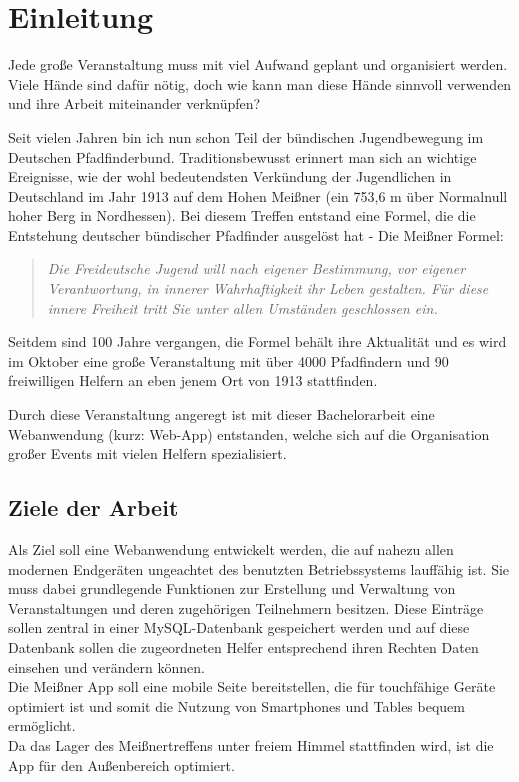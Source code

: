 \chapter{Einleitung}
Jede große Veranstaltung muss mit viel Aufwand geplant und organisiert werden. Viele Hände sind dafür nötig, doch wie kann man diese Hände sinnvoll verwenden und ihre Arbeit miteinander verknüpfen?\par

Seit vielen Jahren bin ich nun schon Teil der bündischen Jugendbewegung im Deutschen Pfadfinderbund. Traditionsbewusst erinnert man sich an wichtige Ereignisse, wie der wohl bedeutendsten Verkündung der Jugendlichen in Deutschland im Jahr 1913 auf dem Hohen Meißner (ein 753,6 m über Normalnull hoher Berg in Nordhessen). Bei diesem Treffen entstand eine Formel, die die Entstehung deutscher bündischer Pfadfinder ausgelöst hat - Die Meißner Formel:
\begin{quote}
	\textit{\glqq Die Freideutsche Jugend will nach eigener Bestimmung, vor eigener Verantwortung, in innerer Wahrhaftigkeit ihr Leben gestalten. Für diese innere Freiheit tritt Sie unter allen Umständen geschlossen ein.\grqq{}}\cite[S. 109]{meissnerformel}
\end{quote}
Seitdem sind 100 Jahre vergangen, die Formel behält ihre Aktualität und es wird im Oktober eine große Veranstaltung mit über 4000 Pfadfindern und 90 freiwilligen Helfern an eben jenem Ort von 1913 stattfinden.\par

Durch diese Veranstaltung angeregt ist mit dieser Bachelorarbeit eine Webanwendung (kurz: Web-App) entstanden, welche sich auf die Organisation großer Events mit vielen Helfern spezialisiert.

\section{Ziele der Arbeit}
Als Ziel soll eine Webanwendung entwickelt werden, die auf nahezu allen modernen Endgeräten ungeachtet des benutzten Betriebssystems lauffähig ist. Sie muss dabei grundlegende Funktionen zur Erstellung und Verwaltung von Veranstaltungen und deren zugehörigen Teilnehmern besitzen. Diese Einträge sollen zentral in einer MySQL-Datenbank gespeichert werden und auf diese Datenbank sollen die zugeordneten Helfer entsprechend ihren Rechten Daten einsehen und verändern können.\\
Die Meißner App soll eine mobile Seite bereitstellen, die für touchfähige Geräte optimiert ist und somit die Nutzung von Smartphones und Tables bequem ermöglicht.\\
Da das Lager des Meißnertreffens unter freiem Himmel stattfinden wird, ist die App für den Außenbereich optimiert.\par

